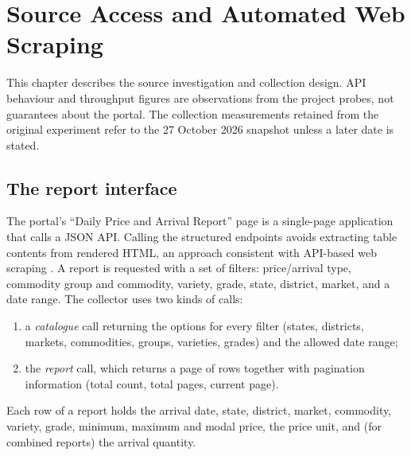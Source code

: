 \documentclass[12pt,a4paper,oneside]{report}
\numberwithin{equation}{chapter}
\numberwithin{figure}{chapter}
\numberwithin{table}{chapter}
\theoremstyle{definition}
\begin{document}
\chapter{Source Access and Automated Web Scraping}

This chapter describes the source investigation and collection design. API behaviour and throughput figures are observations from the project probes, not guarantees about the portal. The collection measurements retained from the original experiment refer to the 27 October 2026 snapshot unless a later date is stated.

\section{The report interface}
The portal's ``Daily Price and Arrival Report'' page is a single-page application that calls a JSON API. Calling the structured endpoints avoids extracting table contents from rendered HTML, an approach consistent with API-based web scraping \cite{glez2014}. A report is requested with a set of filters: price/arrival type, commodity group and commodity, variety, grade, state, district, market, and a date range. The collector uses two kinds of calls:
\begin{enumerate}
  \item a \emph{catalogue} call returning the options for every filter (states, districts, markets, commodities, groups, varieties, grades) and the allowed date range;
  \item the \emph{report} call, which returns a page of rows together with pagination information (total count, total pages, current page).
\end{enumerate}
Each row of a report holds the arrival date, state, district, market, commodity, variety, grade, minimum, maximum and modal price, the price unit, and (for combined reports) the arrival quantity.
\end{document}

